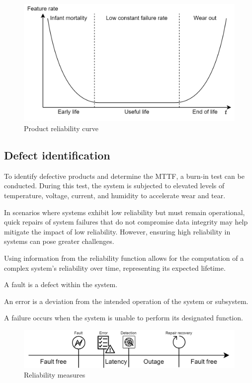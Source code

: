 \begin{figure}[H]
    \centering
    \includegraphics[width=0.55\linewidth]{images/dep2.png}
    \caption{Product reliability curve}
\end{figure}

\subsection{Defect identification}
To identify defective products and determine the MTTF, a burn-in test can be conducted. 
During this test, the system is subjected to elevated levels of temperature, voltage, current, and humidity to accelerate wear and tear.

In scenarios where systems exhibit low reliability but must remain operational, quick repairs of system failures that do not compromise data integrity may help mitigate the impact of low reliability. 
However, ensuring high reliability in systems can pose greater challenges.

Using information from the reliability function allows for the computation of a complex system's reliability over time, representing its expected lifetime.
\begin{definition}
    A fault is a defect within the system.
\end{definition}
\begin{definition}
    An error is a deviation from the intended operation of the system or subsystem.
\end{definition}
\begin{definition}
    A failure occurs when the system is unable to perform its designated function.
\end{definition}
\begin{figure}[H]
    \centering
    \includegraphics[width=0.75\linewidth]{images/rel.png}
    \caption{Reliability measures}
\end{figure}


